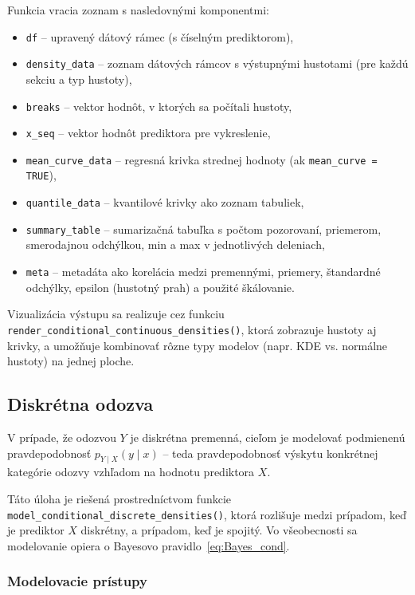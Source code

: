 Funkcia vracia zoznam s nasledovnými komponentmi:

\begin{itemize}
\setlength{\itemsep}{0pt}
  \setlength{\parskip}{0pt}
  \item \texttt{df} – upravený dátový rámec (s číselným prediktorom),
  \item \texttt{density\_data} – zoznam dátových rámcov s výstupnými hustotami (pre každú sekciu a typ hustoty),
  \item \texttt{breaks} – vektor hodnôt, v ktorých sa počítali hustoty,
  \item \texttt{x\_seq} – vektor hodnôt prediktora pre vykreslenie,
  \item \texttt{mean\_curve\_data} – regresná krivka strednej hodnoty (ak \texttt{mean\_curve = TRUE}),
  \item \texttt{quantile\_data} – kvantilové krivky ako zoznam tabuliek,
  \item \texttt{summary\_table} – sumarizačná tabuľka s počtom pozorovaní, priemerom, smerodajnou odchýlkou, min a max v jednotlivých deleniach,
  \item \texttt{meta} – metadáta ako korelácia medzi premennými, priemery, štandardné odchýlky, epsilon (hustotný prah) a použité škálovanie.
\end{itemize}

Vizualizácia výstupu sa realizuje cez funkciu \texttt{render\_conditional\_continuous\_densities()}, ktorá zobrazuje hustoty aj krivky, a umožňuje kombinovať rôzne typy modelov (napr. KDE vs. normálne hustoty) na jednej ploche.

\subsection{Diskrétna odozva}

V prípade, že odozvou $Y$ je diskrétna premenná, cieľom je modelovať podmienenú pravdepodobnosť $p_{Y \mid X}(y \mid x)$ – teda pravdepodobnosť výskytu konkrétnej kategórie odozvy vzhľadom na hodnotu prediktora $X$. 

Táto úloha je riešená prostredníctvom funkcie \texttt{model\_conditional\_discrete\_densities()}, ktorá rozlišuje medzi prípadom, keď je prediktor $X$ diskrétny, a prípadom, keď je spojitý. Vo všeobecnosti sa modelovanie opiera o Bayesovo pravidlo~\ref{eq:Bayes_cond}.

\subsubsection{Modelovacie prístupy}


